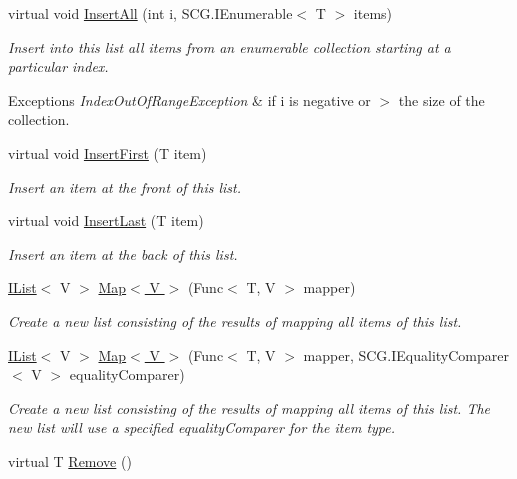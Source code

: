 \begin{DoxyCompactItemize}
virtual void \hyperlink{class_c5_1_1_linked_list_adfc95cf986e2a54a5376e238868adf9c}{Insert\+All} (int i, S\+C\+G.\+I\+Enumerable$<$ T $>$ items)
\begin{DoxyCompactList}\small\item\em Insert into this list all items from an enumerable collection starting at a particular index. 
\begin{DoxyExceptions}{Exceptions}
{\em Index\+Out\+Of\+Range\+Exception} & if i is negative or $>$ the size of the collection. \\
\hline
\end{DoxyExceptions}
\end{DoxyCompactList}\item 
virtual void \hyperlink{class_c5_1_1_linked_list_a6067d9bec9351fc0005cfe9871bd2eb0}{Insert\+First} (T item)
\begin{DoxyCompactList}\small\item\em Insert an item at the front of this list. \end{DoxyCompactList}\item 
virtual void \hyperlink{class_c5_1_1_linked_list_a7499dfb54c0666ddd74f8f0bb53e30f7}{Insert\+Last} (T item)
\begin{DoxyCompactList}\small\item\em Insert an item at the back of this list. \end{DoxyCompactList}\item 
\hyperlink{interface_c5_1_1_i_list}{I\+List}$<$ V $>$ \hyperlink{class_c5_1_1_linked_list_abbc04f5392972731a1df156e98c54c98}{Map$<$ V $>$} (Func$<$ T, V $>$ mapper)
\begin{DoxyCompactList}\small\item\em Create a new list consisting of the results of mapping all items of this list. \end{DoxyCompactList}\item 
\hyperlink{interface_c5_1_1_i_list}{I\+List}$<$ V $>$ \hyperlink{class_c5_1_1_linked_list_a72a7d7f8774986186f63c2dc2f8fceb7}{Map$<$ V $>$} (Func$<$ T, V $>$ mapper, S\+C\+G.\+I\+Equality\+Comparer$<$ V $>$ equality\+Comparer)
\begin{DoxyCompactList}\small\item\em Create a new list consisting of the results of mapping all items of this list. The new list will use a specified equality\+Comparer for the item type. \end{DoxyCompactList}\item 
virtual T \hyperlink{class_c5_1_1_linked_list_a91f46345f78948de9227a25acca79cf0}{Remove} ()

\end{DoxyCompactItemize}
